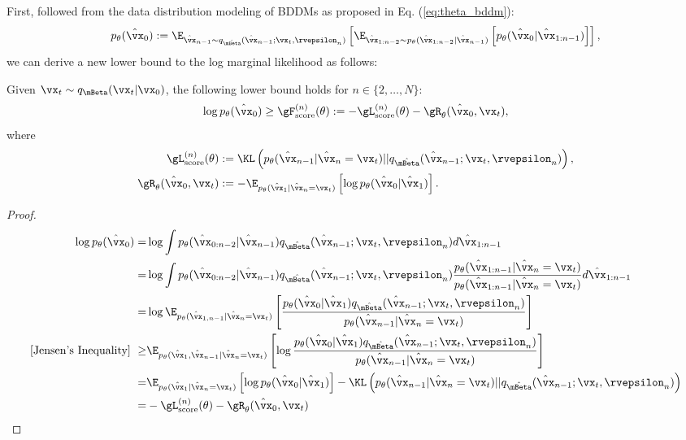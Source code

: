 First, followed from the data distribution modeling of BDDMs as proposed in Eq. (\ref{eq:theta_bddm}):
\begin{align}
\label{eq:theta_bddm_again}
    p_\theta(\hat{\vx}_{0}):=\E_{\hat{\vx}_{n-1}\sim q_{\hat{\mBeta}}(\hat{\vx}_{n-1};\vx_t, \rvepsilon_n)}\left[\E_{\hat{\vx}_{1:n-2}\sim p_\theta(\hat{\vx}_{1:n-2}|\hat{\vx}_{n-1})}\left[ p_\theta(\hat{\vx}_{0}|\hat{\vx}_{1:n-1})\right]\right],
\end{align}
we can derive a new lower bound to the log marginal likelihood as follows:
\begin{proposition}
\label{prop:1}
Given $\vx_t\sim q_\mBeta(\vx_{t}|\vx_0)$, the following lower bound holds for $n\in \{2, \ldots, N\}$:
\begin{align}
    \log p_{\theta} (\hat{\vx}_0)\geq
    \gF_\text{score}^{(n)}(\theta):= -\gL^{(n)}_\text{score}(\theta)-\gR_\theta(\hat{\vx}_0, \vx_t),
\end{align}
where 
\begin{align}
    \gL^{(n)}_\text{score}(\theta)&:=\KL\left({p_\theta (\hat{\vx}_{n-1}|\hat{\vx}_{n}=\vx_t)}||q_{\hat{\mBeta}}(\hat{\vx}_{n-1};\vx_t, \rvepsilon_n)\right),\\
    \gR_\theta(\hat{\vx}_0, \vx_t)&:=-\E_{ p_\theta(\hat{\vx}_1|\hat{\vx}_n=\vx_t)}\left[\log p_\theta(\hat{\vx}_{0}|\hat{\vx}_1)\right].
\end{align}
\end{proposition}
\begin{proof}
\begin{align}
\log p_{\theta}(\hat{\vx}_{0})
=&\log\int p_\theta(\hat{\vx}_{0:n-2}|\hat{\vx}_{n-1}) q_{\hat{\mBeta}}(\hat{\vx}_{n-1};\vx_t, \rvepsilon_n) d\hat{\vx}_{1:n-1}\\
=&\log\int p_\theta(\hat{\vx}_{0:n-2}|\hat{\vx}_{n-1}) q_{\hat{\mBeta}}(\hat{\vx}_{n-1};\vx_t, \rvepsilon_n) \frac{p_\theta(\hat{\vx}_{1:n-1}|\hat{\vx}_n=\vx_t)}{p_\theta(\hat{\vx}_{1:n-1}|\hat{\vx}_n=\vx_t)} d\hat{\vx}_{1:n-1}\\
=&\log\E_{p_\theta(\hat{\vx}_{1,n-1}|\hat{\vx}_n=\vx_t)}\left[\frac{p_\theta(\hat{\vx}_{0}|\hat{\vx}_1)q_{\hat{\mBeta}}(\hat{\vx}_{n-1};\vx_t, \rvepsilon_n)}{p_\theta(\hat{\vx}_{n-1}|\hat{\vx}_n=\vx_t)}\right]\\
\text{[Jensen's Inequality]}\,\,\geq &\E_{ p_\theta(\hat{\vx}_1, \hat{\vx}_{n-1}|\hat{\vx}_n=\vx_t)}\left[\log\frac{p_\theta(\hat{\vx}_{0}|\hat{\vx}_1)q_{\hat{\mBeta}}(\hat{\vx}_{n-1};\vx_t, \rvepsilon_n)}{p_\theta(\hat{\vx}_{n-1}|\hat{\vx}_n=\vx_t)}\right]\\
=&\E_{ p_\theta(\hat{\vx}_1|\hat{\vx}_n=\vx_t)}\left[\log p_\theta(\hat{\vx}_{0}|\hat{\vx}_1)\right]-\KL\left({p_\theta (\hat{\vx}_{n-1}|\hat{\vx}_{n}=\vx_t)}||{q_{\hat{\mBeta}}(\hat{\vx}_{n-1};\vx_t, \rvepsilon_n)}\right)\\
=&-\gL^{(n)}_\text{score}(\theta)-\gR_\theta(\hat{\vx}_0, \vx_t)
\end{align}
\end{proof}
